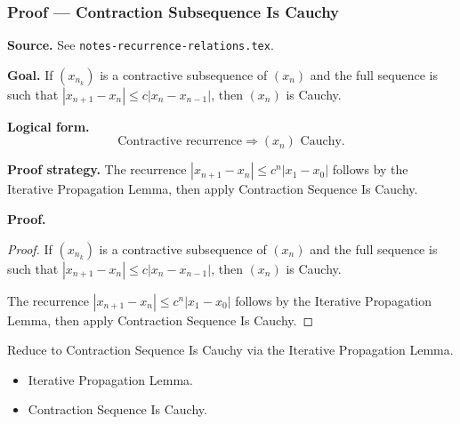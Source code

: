 
\clearpage
{}
\hypertarget{proof-RA-ABB-P-contraction-subseq-cauchy}{}

\subsubsection[Contraction Subsequence Is Cauchy]{Proof --- Contraction Subsequence Is Cauchy}

\bigskip

\noindent
\textbf{Source.} See \texttt{notes-recurrence-relations.tex}.

\vspace{0.75em}

\noindent
\textbf{Goal.} If $(x_{n_k})$ is a contractive subsequence of $(x_n)$ and the full sequence is such that $|x_{n+1} - x_n| \le c |x_n - x_{n-1}|$, then $(x_n)$ is Cauchy.

\vspace{0.75em}

\noindent
\textbf{Logical form.}
\[
  \text{Contractive recurrence} \Rightarrow (x_n) \text{ Cauchy}.
\]

\vspace{0.75em}

\noindent
\textbf{Proof strategy.} The recurrence $|x_{n+1} - x_n| \le c^n |x_1 - x_0|$ follows by the Iterative Propagation Lemma, then apply Contraction Sequence Is Cauchy.

\vspace{0.75em}

\noindent
\textbf{Proof.}
\begin{proof}
\Claim If $(x_{n_k})$ is a contractive subsequence of $(x_n)$ and the full sequence is such that $|x_{n+1} - x_n| \le c |x_n - x_{n-1}|$, then $(x_n)$ is Cauchy.

\Given 

\Goal 

\Strategy The recurrence $|x_{n+1} - x_n| \le c^n |x_1 - x_0|$ follows by the Iterative Propagation Lemma, then apply Contraction Sequence Is Cauchy.

\medskip


\end{proof}

\begin{remark*}
Reduce to Contraction Sequence Is Cauchy via the Iterative Propagation Lemma.
\end{remark*}

\begin{remark*}[Dependencies]
\begin{itemize}
  \item Iterative Propagation Lemma.
  \item Contraction Sequence Is Cauchy.
\end{itemize}
\end{remark*}
